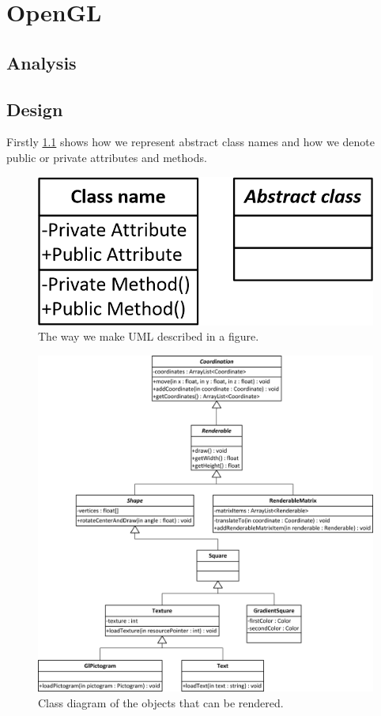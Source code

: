 \chapter{OpenGL}

\section{Analysis}

\section{Design}
Firstly \ref{fig:terminology} shows how we represent abstract class names and how we denote public or private attributes and methods.
\begin{figure}[H]
\centering
\includegraphics[width=0.4\linewidth]{img/terminology.png}%
\caption{The way we make UML described in a figure.}
\label{fig:terminology}
\end{figure}


\begin{figure}[H]
\centering
\includegraphics[width=0.9\linewidth]{img/renderables.png}%
\caption{Class diagram of the objects that can be rendered.}
\label{fig:renderables}
\end{figure}


